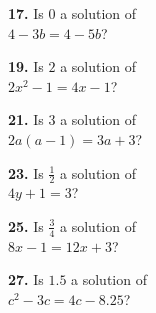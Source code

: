 \documentclass{ximera}
\begin{document}
\begin{problem}
\textbf{17.} Is $0$ a solution of \\ $4 - 3b = 4 - 5b$?

\begin{multipleChoice}
\end{multipleChoice}
\end{problem}

\begin{problem}
\textbf{19.} Is $2$ a solution of \\ $2x^2 - 1 = 4x - 1$?

\begin{multipleChoice}
\end{multipleChoice}
\end{problem}

\begin{problem}
\textbf{21.} Is $3$ a solution of \\ $2a(a - 1) = 3a + 3$?

\begin{multipleChoice}
\end{multipleChoice}
\end{problem}

\begin{problem}
\textbf{23.} Is $\frac{1}{2}$ a solution of \\ $4y + 1 = 3$?

\begin{multipleChoice}
\end{multipleChoice}
\end{problem}

\begin{problem}
\textbf{25.} Is $\frac{3}{4}$ a solution of \\ $8x - 1 = 12x + 3$?

\begin{multipleChoice}
\end{multipleChoice}
\end{problem}

\begin{problem}
\textbf{27.} Is $1.5$ a solution of \\ $c^2 - 3c = 4c - 8.25$?

\begin{multipleChoice}
\end{multipleChoice}
\end{problem}
\end{document}
